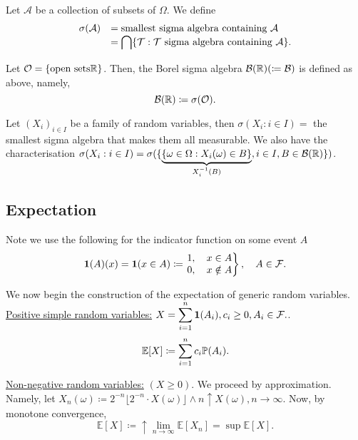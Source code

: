 \documentclass{article}
\begin{document}
Let $ \mathcal{A} $ be a collection of subsets of $ \Omega $. We define 
\[\begin{array}{ll}
	\sigma(\mathcal{A}) &= \text{smallest sigma algebra containing $ \mathcal{A} $} \\
     &=\displaystyle \bigcap \{\mathcal{T}:\mathcal{T} \text{ sigma algebra containing }\mathcal{A}\}.
\end{array}
\]

\begin{boxdef}\label{def: borel sigma alg}
	Let $ \mathcal{O} = \{\text{open sets} \mathbb{R}\} $. Then, the Borel sigma algebra $ \mathcal{B}(\mathbb{R})( \coloneq \mathcal{B} ) $ is defined as above, namely, 
	\[\mathcal{B}(\mathbb{R})\coloneq \sigma(\mathcal{O}).\]
\end{boxdef}

Let $ (X_i)_{i\in I} $ be a family of random variables, then $ \sigma(X_{i}:i\in I) =$ the smallest sigma algebra that makes them all measurable. We also have the characterisation 
$ \sigma(X_{i}: i\in I) = \sigma(\{\underbrace{\{\omega\in \Omega: X_{i}(\omega)\in B\}}_{X^{-1}_{i}(B)}, i\in I, B\in \mathcal{B}(\mathbb{R})\})$.

\subsection{Expectation}

Note we use the following for the indicator function on some event $ A $
\[
    \mathbf{1}(A)(x) = \mathbf{1}(x\in A) 
     \coloneqq \left. \begin{array}{@{}l@{}}
    1, \quad x\in A \\
    0, \quad x\notin A
     \end{array}\right\rbrace, \quad A\in \F.
\]


We now begin the construction of the expectation of generic random variables.\\

\underline{Positive simple random variables:} $X = \displaystyle\sum^{
n}_{i=1}\mathbf{1}(A_{i}), c_{i}\geq 0, A_{i}\in\mathcal{F}.  $.
\[
	\mathbb{E}[X]\coloneqq\displaystyle\sum^{n}_{i=1}c_{i}\mathbb{P}(A_{i}). 
\]


\underline{Non-negative random variables:} $ (X\geq 0). $
We proceed by approximation. Namely, let $ X_{n}(\omega)\coloneqq 2^{-n}\lfloor 2^{-n}\cdot X(\omega)\rfloor \land n \uparrow X(\omega) , n\to \infty$. Now, by monotone convergence, 
\[
	\mathbb{E}[X]\coloneqq \uparrow \displaystyle\lim_{n\to\infty}\mathbb{E}[X_{n}]=\displaystyle\sup\mathbb{E}[X].
\]
\end{document}
